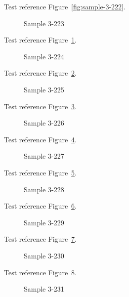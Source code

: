 Test reference Figure~\ref{fig:sample-3-222}.

\begin{figure}[tbhp]
\caption{Sample 3-223}
\label{fig:sample-3-223}
\end{figure}

Test reference Figure~\ref{fig:sample-3-223}.

\begin{figure}[tbhp]
\caption{Sample 3-224}
\label{fig:sample-3-224}
\end{figure}

Test reference Figure~\ref{fig:sample-3-224}.

\begin{figure}[tbhp]
\caption{Sample 3-225}
\label{fig:sample-3-225}
\end{figure}

Test reference Figure~\ref{fig:sample-3-225}.

\begin{figure}[tbhp]
\caption{Sample 3-226}
\label{fig:sample-3-226}
\end{figure}

Test reference Figure~\ref{fig:sample-3-226}.

\begin{figure}[tbhp]
\caption{Sample 3-227}
\label{fig:sample-3-227}
\end{figure}

Test reference Figure~\ref{fig:sample-3-227}.

\begin{figure}[tbhp]
\caption{Sample 3-228}
\label{fig:sample-3-228}
\end{figure}

Test reference Figure~\ref{fig:sample-3-228}.

\begin{figure}[tbhp]
\caption{Sample 3-229}
\label{fig:sample-3-229}
\end{figure}

Test reference Figure~\ref{fig:sample-3-229}.

\begin{figure}[tbhp]
\caption{Sample 3-230}
\label{fig:sample-3-230}
\end{figure}

Test reference Figure~\ref{fig:sample-3-230}.

\begin{figure}[tbhp]
\caption{Sample 3-231}
\label{fig:sample-3-231}
\end{figure}

